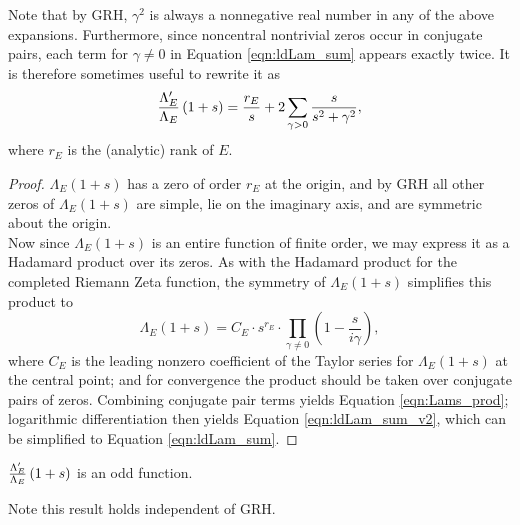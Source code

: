 Note that by GRH, $\gamma^2$ is always a nonnegative real number in any of the above expansions. Furthermore,  since noncentral nontrivial zeros occur in conjugate pairs, each term for $\gamma \ne 0$ in Equation \ref{eqn:ldLam_sum} appears exactly twice. It is therefore sometimes useful to rewrite it as
\begin{equation}\label{eqn:ldLam_sum_v2}
\frac{\Lambda_E^{\prime}}{\Lambda_E}\left(1+s\right) = \frac{r_E}{s} + 2 \sum_{\gamma>0} \frac{s}{s^2+\gamma^2},
\end{equation}
where $r_E$ is the (analytic) rank of $E$.

\begin{proof}
$\Lambda_E(1+s)$ has a zero of order $r_E$ at the origin, and by GRH all other zeros of $\Lambda_E(1+s)$ are simple, lie on the imaginary axis, and are symmetric about the origin. \\

Now since $\Lambda_E(1+s)$ is an entire function of finite order, we may express it as a Hadamard product over its zeros. As with the Hadamard product for the completed Riemann Zeta function, the symmetry of $\Lambda_E(1+s)$ simplifies this product to
\begin{equation}
\Lambda_E(1+s) = C_E \cdot s^{r_E}\cdot \prod_{\gamma\ne0}\left(1-\frac{s}{i\gamma}\right),
\end{equation}
where $C_E$ is the leading nonzero coefficient of the Taylor series for $\Lambda_E(1+s)$ at the central point; and for convergence the product should be taken over conjugate pairs of zeros. Combining conjugate pair terms yields Equation \ref{eqn:Lams_prod}; logarithmic differentiation then yields Equation \ref{eqn:ldLam_sum_v2}, which can be simplified to Equation \ref{eqn:ldLam_sum}.
\end{proof}

\begin{corollary}
$\frac{\Lambda_E^{\prime}}{\Lambda_E}\left(1+s\right)$ is an odd function.
\end{corollary}
Note this result holds independent of GRH. \\

